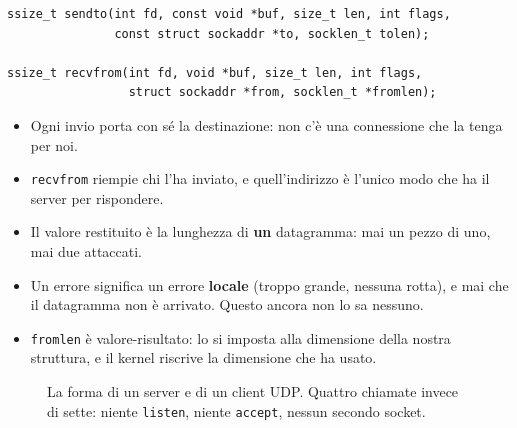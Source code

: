 \begin{lstlisting}[language={[POSIX]C}, style=wnumbers, title={sendto e recvfrom}]
ssize_t sendto(int fd, const void *buf, size_t len, int flags,
               const struct sockaddr *to, socklen_t tolen);

ssize_t recvfrom(int fd, void *buf, size_t len, int flags,
                 struct sockaddr *from, socklen_t *fromlen);
\end{lstlisting}

\begin{itemize}
    \item Ogni invio porta con sé la destinazione: non c'è una connessione che la tenga per noi.
    \item \texttt{recvfrom} riempie chi l'ha inviato, e quell'indirizzo è l'unico modo che ha il server per rispondere.
    \item Il valore restituito è la lunghezza di \textbf{un} datagramma: mai un pezzo di uno, mai due attaccati.
    \item Un errore significa un errore \textbf{locale} (troppo grande, nessuna rotta), e mai che il datagramma non è
          arrivato. Questo ancora non lo sa nessuno.
    \item \texttt{fromlen} è valore-risultato: lo si imposta alla dimensione della nostra struttura, e il kernel riscrive
          la dimensione che ha usato.
\end{itemize}

\begin{figure}[H]
\centering
{}
\caption{La forma di un server e di un client UDP. Quattro chiamate invece di sette: niente \texttt{listen}, niente
         \texttt{accept}, nessun secondo socket.}
\end{figure}

